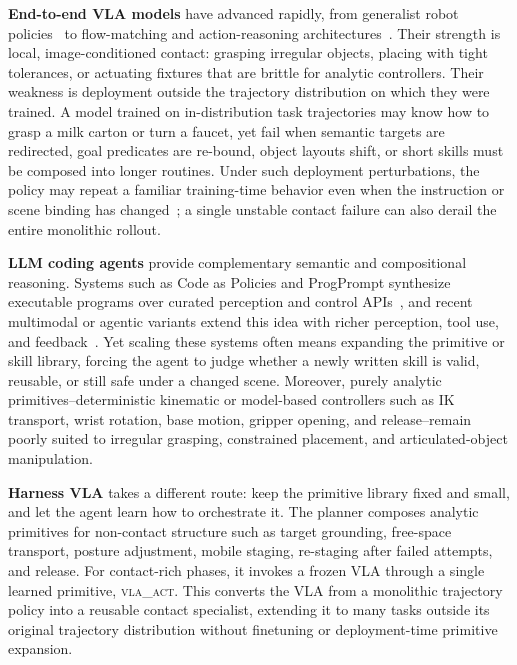 \documentclass{article}
\begin{document}
    \textbf{End-to-end VLA models} have advanced rapidly, from generalist robot policies~\citep{brohan2023rt2, kim2024openvla} to flow-matching and action-reasoning architectures~\citep{black2025pi0, black2025pi05, hung2025nora, molmoact2025}. Their strength is local, image-conditioned contact: grasping irregular objects, placing with tight tolerances, or actuating fixtures that are brittle for analytic controllers. Their weakness is deployment outside the trajectory distribution on which they were trained. A model trained on in-distribution task trajectories may know how to grasp a milk carton or turn a faucet, yet fail when semantic targets are redirected, goal predicates are re-bound, object layouts shift, or short skills must be composed into longer routines. Under such deployment perturbations, the policy may repeat a familiar training-time behavior even when the instruction or scene binding has changed~\citep{kim2024openvla, black2025pi05, pi0-experiment-wild}; a single unstable contact failure can also derail the entire monolithic rollout.

    \textbf{LLM coding agents} provide complementary semantic and compositional reasoning. Systems such as Code as Policies and ProgPrompt synthesize executable programs over curated perception and control APIs~\citep{liang2023code, singh2023progprompt}, and recent multimodal or agentic variants extend this idea with richer perception, tool use, and feedback~\citep{gupta2023visprog, shi2025maestro, fu2026cap, zhang2026playful}. Yet scaling these systems often means expanding the primitive or skill library, forcing the agent to judge whether a newly written skill is valid, reusable, or still safe under a changed scene. Moreover, purely analytic primitives--deterministic kinematic or model-based controllers such as IK transport, wrist rotation, base motion, gripper opening, and release--remain poorly suited to irregular grasping, constrained placement, and articulated-object manipulation.

    \textbf{Harness VLA} takes a different route: keep the primitive library fixed and small, and let the agent learn how to orchestrate it. The planner composes analytic primitives for non-contact structure such as target grounding, free-space transport, posture adjustment, mobile staging, re-staging after failed attempts, and release. For contact-rich phases, it invokes a frozen VLA through a single learned primitive, \textsc{vla\_act}. This converts the VLA from a monolithic trajectory policy into a reusable contact specialist, extending it to many tasks outside its original trajectory distribution without finetuning or deployment-time primitive expansion.
\end{document}
